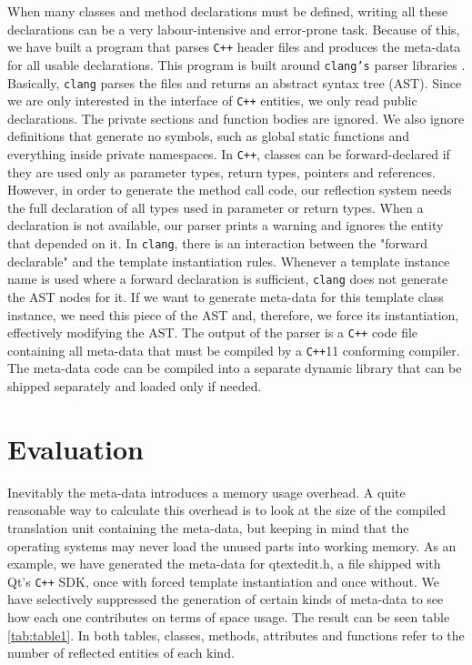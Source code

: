 When many classes and method declarations must be defined, writing all these declarations can be a very
labour-intensive and error-prone task. Because of this, we have built a program that parses \texttt{C++}
header files and produces the meta-data for all usable declarations. This program is built around \texttt{clang's}
parser libraries \cite{clang}. Basically, \texttt{clang} parses the files and returns an abstract syntax tree (AST).
Since we are only interested in the interface of \texttt{C++} entities, we only read public declarations. The
private sections and function bodies are ignored. We also ignore definitions that generate no symbols, such as
global static functions and everything inside private namespaces. In \texttt{C++}, classes can be forward-declared
if they are used only as parameter types, return types, pointers and references. However, in order to generate the
method call code, our reflection system needs the full declaration of all types used in parameter or return types.
When a declaration is not available, our parser prints a warning and ignores the entity that depended on it. In
\texttt{clang}, there is an interaction between the "forward declarable" and the template instantiation rules.
Whenever a template instance name is used where a forward declaration is sufficient, \texttt{clang} does not
generate the AST nodes for it. If we want to generate meta-data for this template class instance, we need this
piece of the AST and, therefore, we force its instantiation, effectively modifying the AST. The output of the
parser is a \texttt{C++} code file containing all meta-data that must be compiled by a \texttt{C++}11 conforming
compiler. The meta-data code can be compiled into a separate dynamic library that can be shipped separately and
loaded only if needed.


\section{Evaluation}
\label{evaluation}

Inevitably the meta-data introduces a memory usage overhead. A quite reasonable way to
calculate this overhead is to look at the size of the compiled translation unit containing the meta-data, but keeping in mind that
the operating systems may never load the unused parts into working memory. As an example, we have
generated the meta-data for qtextedit.h, a file shipped with Qt's \texttt{C++} SDK, once with forced template instantiation
and once without. We have selectively suppressed the generation of certain kinds of meta-data to see how each one contributes
on terms of space usage. The result can be seen table \ref{tab:table1}.
In both tables, classes, methods, attributes and functions refer to the number of reflected entities of each kind.

